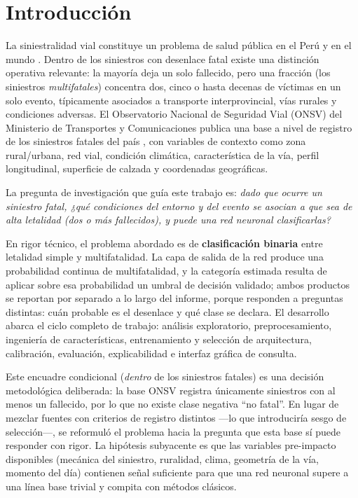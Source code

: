\section{Introducción}\label{sec:introduccion}

La siniestralidad vial constituye un problema de salud pública en el Perú y en el mundo \cite{who_road_safety_2023}. Dentro de los siniestros con desenlace fatal existe una distinción operativa relevante: la mayoría deja un solo fallecido, pero una fracción (los siniestros \emph{multifatales}) concentra dos, cinco o hasta decenas de víctimas en un solo evento, típicamente asociados a transporte interprovincial, vías rurales y condiciones adversas. El Observatorio Nacional de Seguridad Vial (ONSV) del Ministerio de Transportes y Comunicaciones publica una base a nivel de registro de los siniestros fatales del país \cite{onsv_siniestros_fatales_2021_2025}, con variables de contexto como zona rural/urbana, red vial, condición climática, característica de la vía, perfil longitudinal, superficie de calzada y coordenadas geográficas.

La pregunta de investigación que guía este trabajo es: \emph{dado que ocurre un siniestro fatal, ¿qué condiciones del entorno y del evento se asocian a que sea de alta letalidad (dos o más fallecidos), y puede una red neuronal clasificarlas?}

En rigor técnico, el problema abordado es de \textbf{clasificación binaria} entre letalidad simple y multifatalidad. La capa de salida de la red produce una probabilidad continua de multifatalidad, y la categoría estimada resulta de aplicar sobre esa probabilidad un umbral de decisión validado; ambos productos se reportan por separado a lo largo del informe, porque responden a preguntas distintas: cuán probable es el desenlace y qué clase se declara. El desarrollo abarca el ciclo completo de trabajo: análisis exploratorio, preprocesamiento, ingeniería de características, entrenamiento y selección de arquitectura, calibración, evaluación, explicabilidad e interfaz gráfica de consulta.

Este encuadre condicional (\emph{dentro} de los siniestros fatales) es una decisión metodológica deliberada: la base ONSV registra únicamente siniestros con al menos un fallecido, por lo que no existe clase negativa ``no fatal''. En lugar de mezclar fuentes con criterios de registro distintos ---lo que introduciría sesgo de selección---, se reformuló el problema hacia la pregunta que esta base sí puede responder con rigor. La hipótesis subyacente es que las variables pre-impacto disponibles (mecánica del siniestro, ruralidad, clima, geometría de la vía, momento del día) contienen señal suficiente para que una red neuronal supere a una línea base trivial y compita con métodos clásicos.
